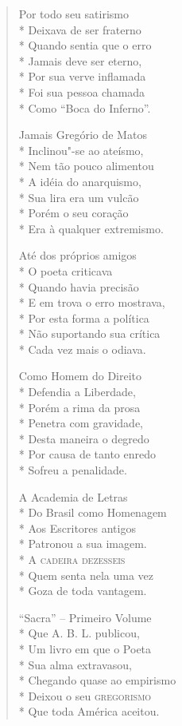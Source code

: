 \begin{verse}
Por todo seu satirismo\\*
Deixava de ser fraterno\\*
Quando sentia que o erro\\*
Jamais deve ser eterno,\\*
Por sua verve inflamada\\*
Foi sua pessoa chamada\\*
Como ``Boca do Inferno''.

Jamais Gregório de Matos\\*
Inclinou"-se ao ateísmo,\\*
Nem tão pouco alimentou\\*
A idéia do anarquismo,\\*
Sua lira era um vulcão\\*
Porém o seu coração\\*
Era à qualquer extremismo.

Até dos próprios amigos\\*
O poeta criticava\\*
Quando havia precisão\\*
E em trova o erro mostrava,\\*
Por esta forma a política\\*
Não suportando sua crítica\\*
Cada vez mais o odiava.

Como Homem do Direito\\*
Defendia a Liberdade,\\*
Porém a rima da prosa\\*
Penetra com gravidade,\\*
Desta maneira o degredo\\*
Por causa de tanto enredo\\*
Sofreu a penalidade.

A Academia de Letras\\*
Do Brasil como Homenagem\\*
Aos Escritores antigos\\*
Patronou a sua imagem.\\*
A \textsc{cadeira dezesseis}\\*
Quem senta nela uma vez\\*
Goza de toda vantagem.

``Sacra'' -- Primeiro Volume\\*
Que A. B. L. publicou,\\*
Um livro em que o Poeta\\*
Sua alma extravasou,\\*
Chegando quase ao empirismo\\*
Deixou o seu \textsc{gregorismo}\\*
Que toda América aceitou.


\end{verse}
